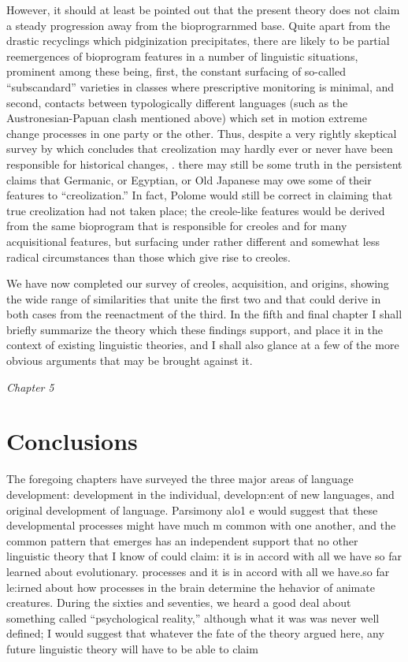 However, it should at least be pointed out that the present theory does not claim a steady progression away from the biopro\-grarnmed base. Quite apart from the drastic recyclings which pidginiza\-tion precipitates, there are likely to be partial reemergences of bio\-program features in a number of linguistic situations, prominent among these being, first, the constant surfacing of so-called ``subscandard'' varieties in classes where prescriptive monitoring is minimal, and second, contacts between typologically different languages (such as the Austronesian-Papuan clash mentioned above) which set in motion extreme change processes in one party or the other. Thus, despite a very rightly skeptical survey by \citet{Polome1980} which concludes that creolization may hardly ever or never have been responsible for histo\-rical changes, . there may still be some truth in the persistent claims that Germanic, or Egyptian, or Old Japanese may owe some of their features to ``creolization.'' In fact, Polome would still be correct in claiming that true creolization had not taken place; the creole-like features would be derived from the same bioprogram that is responsible for creoles and for many acquisitional features, but surfacing under rather different and somewhat less radical circumstances than those which give rise to creoles.

We have now completed our survey of creoles, acquisition, and origins, showing the wide range of similarities that unite the first two and that could derive in both cases from the reenactment of the third. In the fifth and final chapter I shall briefly summarize the theory which these findings support, and place it in the context of existing linguistic theories, and I shall also glance at a few of the more obvious arguments that may be brought against it.


\textit{Chapter} \textit{5}
\chapter{Conclusions}

The foregoing chapters have surveyed the three major areas of language development: development in the individual, developn:ent of new languages, and original development of language. Parsimony alo1 e would suggest that these developmental processes might have much m common with one another, and the common pattern that emerges has an independent support that no other linguistic theory that I know of could claim: it is in accord with all we have so far learned about evo\-lutionary. processes and it is in accord with all we have.so far le:irned about how processes in the brain determine the hehavior of animate creatures. During the sixties and seventies, we heard a good deal about something called ``psychological reality,'' although what it was was never well defined; I would suggest that whatever the fate of the theory argued here, any future linguistic theory will have to be able to claim

